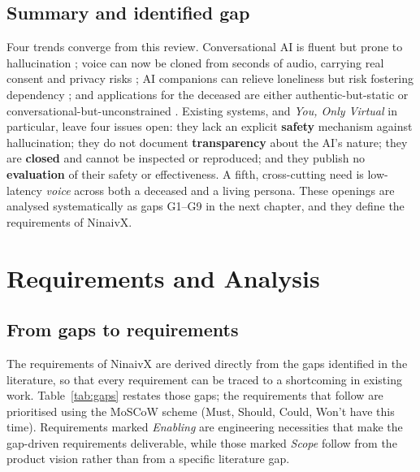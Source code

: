 \documentclass[11pt,a4paper]{report}
\begin{document}
\section{Summary and identified gap}
\label{sec:gap}
Four trends converge from this review. Conversational AI is fluent but prone to hallucination \cite{brown2020language,ji2023survey}; voice can now be cloned from seconds of audio, carrying real consent and privacy risks \cite{wang2023valle,elevenlabs}; AI companions can relieve loneliness but risk fostering dependency \cite{ta2020user,laestadius2024human}; and applications for the deceased are either authentic-but-static \cite{hereafter} or conversational-but-unconstrained \cite{fagone2021jessica}. Existing systems, and \emph{You, Only Virtual} in particular, leave four issues open: they lack an explicit \textbf{safety} mechanism against hallucination; they do not document \textbf{transparency} about the AI's nature; they are \textbf{closed} and cannot be inspected or reproduced; and they publish no \textbf{evaluation} of their safety or effectiveness. A fifth, cross-cutting need is low-latency \emph{voice} across both a deceased and a living persona. These openings are analysed systematically as gaps G1--G9 in the next chapter, and they define the requirements of NinaivX.

\chapter{Requirements and Analysis}
\label{ch:requirements}

\section{From gaps to requirements}
The requirements of NinaivX are derived directly from the gaps identified in the literature, so that every requirement can be traced to a shortcoming in existing work. Table~\ref{tab:gaps} restates those gaps; the requirements that follow are prioritised using the MoSCoW scheme (Must, Should, Could, Won't have this time). Requirements marked \emph{Enabling} are engineering necessities that make the gap-driven requirements deliverable, while those marked \emph{Scope} follow from the product vision rather than from a specific literature gap.
\end{document}

